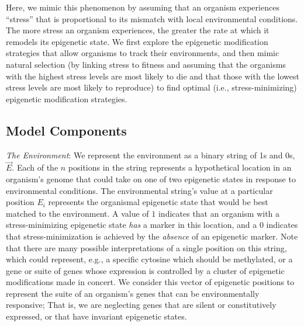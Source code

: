 \documentclass{article}
\begin{document}
Here, we mimic this phenomenon by assuming that an organism experiences ``stress'' that is proportional to its mismatch with local environmental conditions. The more stress an organism experiences, the greater the rate at which it remodels its epigenetic state. We first explore the epigenetic modification strategies that allow organisms to track their environments, and then mimic natural selection (by linking stress to fitness and assuming that the organisms with the highest stress levels are most likely to die and that those with the lowest stress levels are most likely to reproduce) to find optimal (i.e., stress-minimizing) epigenetic modification strategies.

\subsection{Model Components}


\noindent \textit{The Environment}: We represent the environment as a binary string of 1s and 0s, $\vec{E}$. Each of the $n$ positions in the string represents a hypothetical location in an organism's genome that could take on one of two epigenetic states in response to environmental conditions. The environmental string's value at a particular position $E_i$ represents the organismal epigenetic state that would be best matched to the environment. %
A value of $1$ indicates that an organism with a stress-minimizing epigenetic state \textit{has} a marker in this location, and a $0$ indicates that stress-minimization is achieved by the \textit{absence} of an epigenetic marker. Note that there are many possible interpretations of a single position on this string, which could represent, e.g., a specific cytosine which should be methylated, or a gene or suite of genes whose expression is controlled by a cluster of epigenetic modifications made in concert. 
We consider this vector of epigenetic positions to represent the suite of an organism's genes that can be environmentally responsive; That is, we are neglecting genes that are silent or constitutively expressed, or that have invariant epigenetic states.
\end{document}
